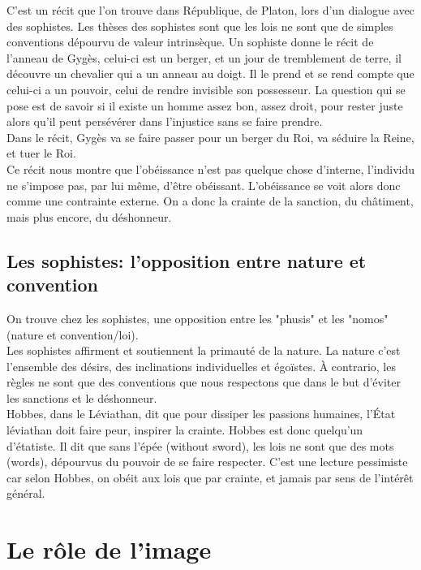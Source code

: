 \documentclass[10pt, a4paper, openany]{book}
\begin{document}
C'est un récit que l'on trouve dans République, de Platon, lors d'un dialogue avec des sophistes. Les thèses des sophistes sont que les lois ne sont que de simples conventions dépourvu de valeur intrinsèque. Un sophiste donne le récit de l'anneau de Gygès, celui-ci est un berger, et un jour de tremblement de terre, il découvre un chevalier qui a un anneau au doigt. Il le prend et se rend compte que celui-ci a un pouvoir, celui de rendre invisible son possesseur. La question qui se pose est de savoir si il existe un homme assez bon, assez droit, pour rester juste alors qu'il peut persévérer dans l'injustice sans se faire prendre. \\
Dans le récit, Gygès va se faire passer pour un berger du Roi, va séduire la Reine, et tuer le Roi. \\
Ce récit nous montre que l'obéissance n'est pas quelque chose d'interne, l'individu ne s'impose pas, par lui même, d'être obéissant. L'obéissance se voit alors donc comme une contrainte externe. On a donc la crainte de la sanction, du châtiment, mais plus encore, du déshonneur. 

\subsection{Les sophistes: l'opposition entre nature et convention}

On trouve chez les sophistes, une opposition entre les "phusis" et les "nomos" (nature et convention/loi). \\
Les sophistes affirment et soutiennent la primauté de la nature. La nature c'est l'ensemble des désirs, des inclinations individuelles et égoïstes. À contrario, les règles ne sont que des conventions que nous respectons que dans le but d'éviter les sanctions et le déshonneur. \\
Hobbes, dans le Léviathan, dit que pour dissiper les passions humaines, l'État léviathan doit faire peur, inspirer la crainte. Hobbes est donc quelqu'un d'étatiste. Il dit que sans l'épée (without sword), les lois ne sont que des mots (words), dépourvus du pouvoir de se faire respecter. C'est une lecture pessimiste car selon Hobbes, on obéit aux lois que par crainte, et jamais par sens de l'intérêt général. 

\section{Le rôle de l'image}
\end{document}
